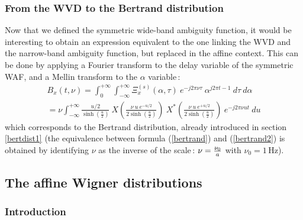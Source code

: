 \subsubsection{From the WVD to the Bertrand distribution}
\label{bertdist2}
  Now that we defined the symmetric wide-band ambiguity function, it would
be interesting to obtain an expression equivalent to the one linking the
WVD and the narrow-band ambiguity function, but replaced in the affine
context. This can be done by applying a Fourier transform to the delay
variable of the symmetric WAF, and a Mellin transform to the $\alpha$
variable\,:
\begin{eqnarray}
\label{bertrand2}
B_x(t,\nu) = \int_0^{+\infty} \int_{-\infty}^{+\infty}
\Xi_x^{(s)}(\alpha,\tau)\ e^{-j2\pi\nu \tau}\ \alpha^{j2\pi t-1}\ d\tau\
d\alpha\nonumber\\ 
=\nu \int_{-\infty}^{+\infty} \frac{u/2}{\sinh\left(\frac{u}{2}\right)}\ 
  X\left(\frac{\nu\ u\ e^{-u/2}}{2 \sinh\left(\frac{u}{2}\right)}\right)\
X^*\left(\frac{\nu\ u\ e^{+u/2}}{2 \sinh\left(\frac{u}{2}\right)}\right)\
e^{-j2\pi\nu ut}\ du   
\end{eqnarray}
which corresponds to the Bertrand distribution, already introduced in
section \ref{bertdist1} (the equivalence between formula (\ref{bertrand}) and
(\ref{bertrand2}) is obtained by identifying $\nu$ as the inverse of the
scale\,: $\nu={\nu_0\over a}$ with $\nu_0=1$\,Hz).



\subsection{The affine Wigner distributions}
\label{AWD} 
\subsubsection{Introduction}

